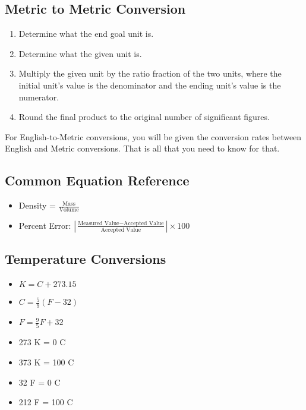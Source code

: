 
\begin{minipage}{\textwidth}
\subsection{Metric to Metric Conversion}

\begin{enumerate}
	\item Determine what the end goal unit is.
	\item Determine what the given unit is.
	\item Multiply the given unit by the ratio fraction of the two units, where the initial unit's value is the denominator and the ending unit's value is the numerator.
	\item Round the final product to the original number of significant figures. \\
\end{enumerate}
\end{minipage}

For English-to-Metric conversions, you will be given the conversion rates between English and Metric conversions. That is all that you need to know for that.

\subsection{Common Equation Reference}
\begin{itemize}
\item Density = $\frac{\text{Mass}}{\text{Volume}}$
\item Percent Error: $|\frac{\text{Measured Value} - \text{Accepted Value}}{\text{Accepted Value}}| \times 100$
\end{itemize}

\subsection{Temperature Conversions}
\begin{itemize}
\item $K = C + 273.15$
\item $C = \frac{5}{9}(F - 32)$
\item $F = \frac{9}{5}F + 32$
\item 273 K = 0 C
\item 373 K = 100 C
\item 32 F = 0 C
\item 212 F = 100 C
\end{itemize}
